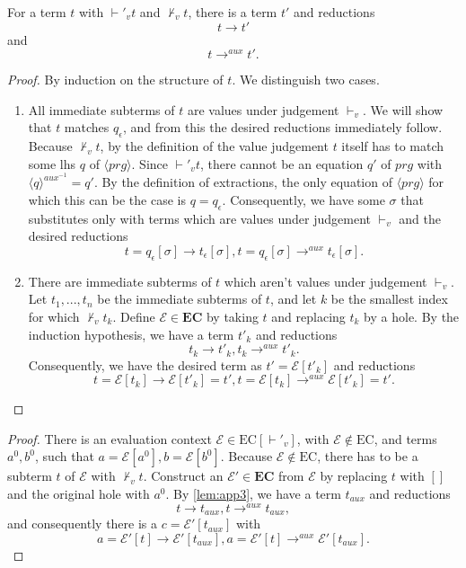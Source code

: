\begin{lemma}
\label{lem:app3}

For a term $t$ with $\vdash'_v t$ and $\not\vdash_v t$, there is a term $t'$ and reductions
\[
t \longrightarrow t'
\]
and
\[
t \longrightarrow^{aux} t'.
\]

\begin{proof}

By induction on the structure of $t$. We distinguish two cases.
\begin{enumerate}
\item All immediate subterms of $t$ are values under judgement $\vdash_v$. We will show that $t$ matches $q_\epsilon$, and from this the desired reductions immediately follow. Because $\not\vdash_v t$, by the definition of the value judgement $t$ itself has to match some lhs $q$ of $\langle prg \rangle$. Since $\vdash'_v t$, there cannot be an equation $q'$ of $prg$ with $\langle q \rangle^{aux^{-1}} = q'$. By the definition of extractions, the only equation of $\langle prg \rangle$ for which this can be the case is $q = q_\epsilon$. Consequently, we have some $\sigma$ that substitutes only with terms which are values under judgement $\vdash_v$ and the desired reductions
\[
t = q_\epsilon[\sigma] \longrightarrow t_\epsilon[\sigma], t = q_\epsilon[\sigma] \longrightarrow^{aux} t_\epsilon[\sigma].
\]

\item There are immediate subterms of $t$ which aren't values under judgement $\vdash_v$.
Let $t_1, ..., t_n$ be the immediate subterms of $t$, and let $k$ be the smallest index for which $\not\vdash_v t_k$. Define $\mathcal{E} \in \mathbf{EC}$ by taking $t$ and replacing $t_k$ by a hole. By the induction hypothesis, we have a term $t'_k$ and reductions
\[
t_k \longrightarrow t'_k, t_k \longrightarrow^{aux} t'_k.
\]
Consequently, we have the desired term as $t' = \mathcal{E}[t'_k]$ and reductions
\[
t = \mathcal{E}[t_k] \longrightarrow \mathcal{E}[t'_k] = t', t = \mathcal{E}[t_k] \longrightarrow^{aux} \mathcal{E}[t'_k] = t'.
\]
\end{enumerate}

\end{proof}

\end{lemma}

\compl*
\begin{proof}

There is an evaluation context $\mathcal{E} \in \textrm{EC}[\vdash'_v]$, with $\mathcal{E} \not\in \textrm{EC}$, and terms $a^0, b^0$, such that $a = \mathcal{E}[a^0], b = \mathcal{E}[b^0]$. Because $\mathcal{E} \not\in \textrm{EC}$, there has to be a subterm $t$ of $\mathcal{E}$ with $\not\vdash_v t$. Construct an $\mathcal{E}' \in \mathbf{EC}$ from $\mathcal{E}$ by replacing $t$ with $[]$ and the original hole with $a^0$. By \autoref{lem:app3}, we have a term $t_{aux}$ and reductions
\[
t \longrightarrow t_{aux}, t \longrightarrow^{aux} t_{aux},
\]
and consequently there is a $c = \mathcal{E}'[t_{aux}]$ with
\[
a = \mathcal{E}'[t] \longrightarrow \mathcal{E}'[t_{aux}], a = \mathcal{E}'[t] \longrightarrow^{aux} \mathcal{E}'[t_{aux}].
\]

\end{proof}

